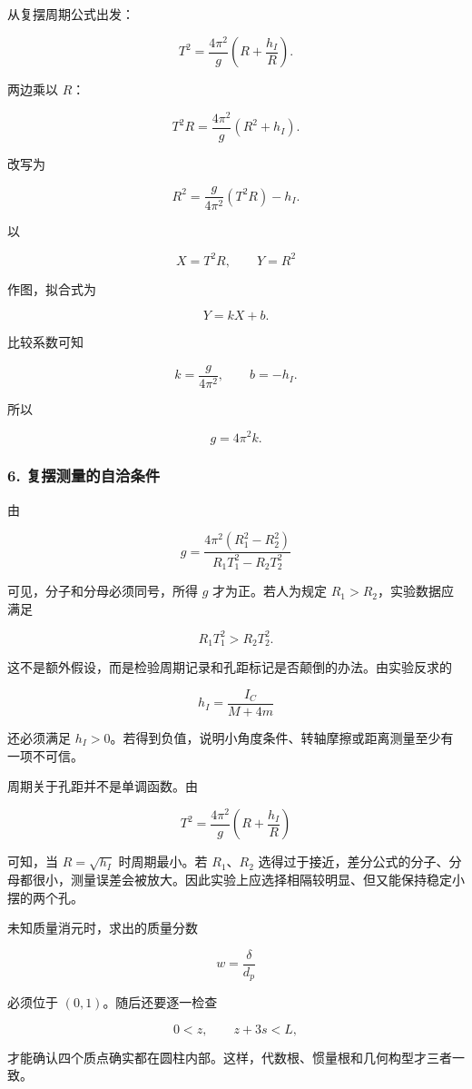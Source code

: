 \documentclass[12pt,a4paper,UTF8]{ctexart}
\begin{document}
从复摆周期公式出发：

\[
T^2=\frac{4\pi^2}{g}\left(R+\frac{h_I}{R}\right).
\]

两边乘以 \(R\)：

\[
T^2R=\frac{4\pi^2}{g}\left(R^2+h_I\right).
\]

改写为

\[
R^2=\frac{g}{4\pi^2}(T^2R)-h_I.
\]

以

\[
X=T^2R,
\qquad
Y=R^2
\]

作图，拟合式为

\[
Y=kX+b.
\]

比较系数可知

\[
k=\frac{g}{4\pi^2},
\qquad
b=-h_I.
\]

所以

\[
\boxed{g=4\pi^2k}.
\]

\subsubsection{6.
复摆测量的自洽条件}\label{ux590dux6446ux6d4bux91cfux7684ux81eaux6d3dux6761ux4ef6}

由

\[
g=\frac{4\pi^2(R_1^2-R_2^2)}{R_1T_1^2-R_2T_2^2}
\]

可见，分子和分母必须同号，所得 \(g\) 才为正。若人为规定
\(R_1>R_2\)，实验数据应满足

\[
R_1T_1^2>R_2T_2^2.
\]

这不是额外假设，而是检验周期记录和孔距标记是否颠倒的办法。由实验反求的

\[
h_I=\frac{I_C}{M+4m}
\]

还必须满足
\(h_I>0\)。若得到负值，说明小角度条件、转轴摩擦或距离测量至少有一项不可信。

周期关于孔距并不是单调函数。由

\[
T^2=\frac{4\pi^2}{g}\left(R+\frac{h_I}{R}\right)
\]

可知，当 \(R=\sqrt{h_I}\) 时周期最小。若 \(R_1\)、\(R_2\)
选得过于接近，差分公式的分子、分母都很小，测量误差会被放大。因此实验上应选择相隔较明显、但又能保持稳定小摆的两个孔。

未知质量消元时，求出的质量分数

\[
w=\frac{\delta}{d_p}
\]

必须位于 \((0,1)\)。随后还要逐一检查

\[
0<z,
\qquad
z+3s<L,
\]

才能确认四个质点确实都在圆柱内部。这样，代数根、惯量根和几何构型才三者一致。
\end{document}

